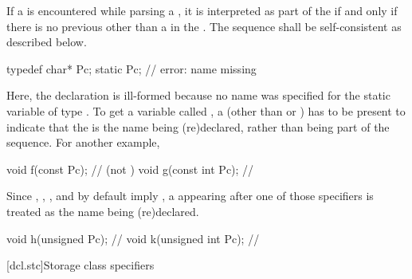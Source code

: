 \pnum
{}%
If a  is encountered while parsing a ,
it is interpreted as part of the  if and only if there is no
previous  other than a  in the
.
The sequence shall be self-consistent as
described below.
\enterexample

\begin{codeblock}
typedef char* Pc;
static Pc;                      // error: name missing
\end{codeblock}

Here, the declaration   is ill-formed because no
name was specified for the static variable of type . To get a
variable called , a  (other than
 or ) has to be present to indicate that
the   is the name being (re)declared,
rather than being part of the  sequence. For
another example,

\begin{codeblock}
void f(const Pc);               //  (not )
void g(const int Pc);           // 
\end{codeblock}
\exitexample

\pnum
{}%
%
%
%
\enternote
Since , , , and 
by default imply , a  appearing after one
of those specifiers is treated as the name being (re)declared.
\enterexample

\begin{codeblock}
void h(unsigned Pc);            // 
void k(unsigned int Pc);        // 
\end{codeblock}
\exitexample
\exitnote

[dcl.stc]{Storage class specifiers}%
%
%
%
%
%
%

